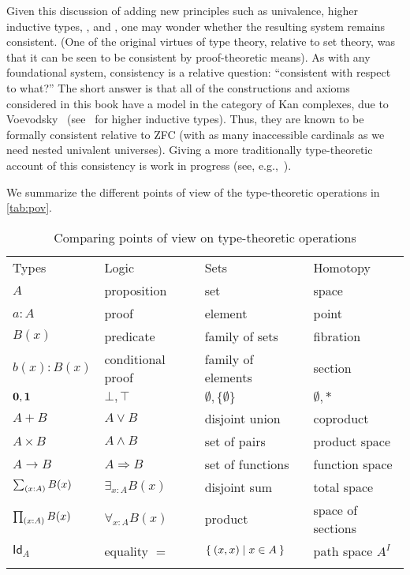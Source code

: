 Given this discussion of adding new principles such as univalence, higher inductive types, \choice{}, and \LEM{}, one may wonder whether the resulting system remains consistent.
(One of the original virtues of type theory, relative to set theory, was that it can be seen to be consistent by proof-theoretic means).
As with any foundational system, consistency is a relative question: ``consistent with respect to what?''
The short answer is that all of the constructions and axioms considered in this book have a model in the category of Kan complexes, due to Voevodsky~\cite{klv:ssetmodel} (see~\cite{ls:hits} for higher inductive types).
Thus, they are known to be formally consistent relative to ZFC (with as many inaccessible cardinals
%
as we need nested univalent universes).
Giving a more traditionally type-theoretic account of this consistency is work in progress (see,
e.g.,~\cite{lh:canonicity,coquand2012constructive}).

We summarize the different points of view of the type-theoretic operations in \autoref{tab:pov}.

\begin{table}[htb]
  \centering
  \OPTsmalltable
 \begin{tabular}{llll}
    \toprule
       Types & Logic & Sets & Homotopy\\ \addlinespace[2pt]
    \midrule
       $A$ & proposition & set & space\\ \addlinespace[2pt]
       $a:A$ & proof & element & point \\ \addlinespace[2pt]
       $B(x)$ & predicate & family of sets & fibration \\ \addlinespace[2pt]
       $b(x) : B(x)$ & conditional proof & family of elements & section\\ \addlinespace[2pt]
       $\mathbf{0}, \mathbf{1}$ & $\bot, \top$ & $\emptyset, \{ \emptyset \}$ & $\emptyset, *$\\ \addlinespace[2pt]
       $A + B$ & $A\vee B$ & disjoint union & coproduct\\ \addlinespace[2pt]
       $A\times B$ & $A\wedge B$ & set of pairs & product space\\ \addlinespace[2pt]
       $A\to B$ & $A\Rightarrow B$ & set of functions & function space\\ \addlinespace[2pt]
       $\sm{x:A}B(x)$ &  $\exists_{x:A}B(x)$ & disjoint sum & total space\\ \addlinespace[2pt]
       $\prd{x:A}B(x)$ &  $\forall_{x:A}B(x)$ & product & space of sections\\ \addlinespace[2pt]
       $\mathsf{Id}_{A}$ & equality $=$ & $\Set{{\mathopen{}(x,x)\mathclose{}} | x\in A}$ & path space $A^I$ \\ \addlinespace[2pt]
    \bottomrule
  \end{tabular}
  \caption{Comparing points of view on type-theoretic operations}\label{tab:pov}
\end{table}


